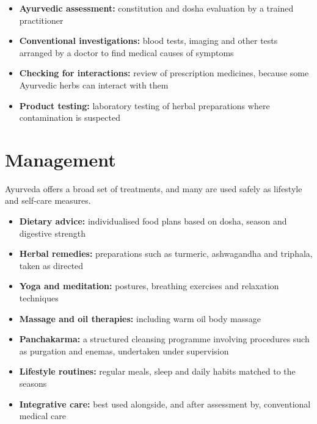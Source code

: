 \begin{itemize}
    \item \textbf{Ayurvedic assessment:} constitution and dosha evaluation by a trained practitioner
    \item \textbf{Conventional investigations:} blood tests, imaging and other tests arranged by a doctor to find medical causes of symptoms
    \item \textbf{Checking for interactions:} review of prescription medicines, because some Ayurvedic herbs can interact with them
    \item \textbf{Product testing:} laboratory testing of herbal preparations where contamination is suspected
\end{itemize}

\section*{Management}
Ayurveda offers a broad set of treatments, and many are used safely as lifestyle and self-care measures.

\begin{itemize}
    \item \textbf{Dietary advice:} individualised food plans based on dosha, season and digestive strength
    \item \textbf{Herbal remedies:} preparations such as turmeric, ashwagandha and triphala, taken as directed
    \item \textbf{Yoga and meditation:} postures, breathing exercises and relaxation techniques
    \item \textbf{Massage and oil therapies:} including warm oil body massage
    \item \textbf{Panchakarma:} a structured cleansing programme involving procedures such as purgation and enemas, undertaken under supervision
    \item \textbf{Lifestyle routines:} regular meals, sleep and daily habits matched to the seasons
    \item \textbf{Integrative care:} best used alongside, and after assessment by, conventional medical care
\end{itemize}

